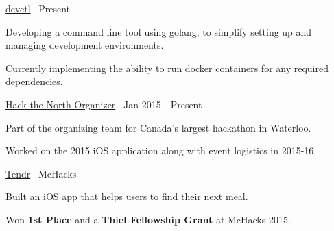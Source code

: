 

\begin{cventries}

  \cvprojectentry
    {\href{https://github.com/devctl/devctl}{devctl}\ \faPaperclip} %
    {Present}
    {
      \begin{cvitems} %
        \item {Developing a command line tool using golang, to simplify setting up and managing development environments.}
        \item {Currently implementing the ability to run docker containers for any required dependencies.}
      \end{cvitems}
    }

  \cvprojectentry
	{\href{https://hackthenorth.com}{Hack the North Organizer}\ \faPaperclip}    
	{Jan 2015 - Present}
    {
      \begin{cvitems} %
        \item {Part of the organizing team for Canada's largest hackathon in Waterloo.}
        \item {Worked on the 2015 iOS application along with event logistics in 2015-16.}
      \end{cvitems}
    }

  \cvprojectentry
    {\href{http://devpost.com/software/tendr}{Tendr}\ \faPaperclip} %
    {McHacks}
    {
      \begin{cvitems} %
        \item {Built an iOS app that helps users to find their next meal.}
        \item {Won \textbf{1st Place} and a \textbf{Thiel Fellowship Grant} at McHacks 2015.}
      \end{cvitems}
    }


\end{cventries}
